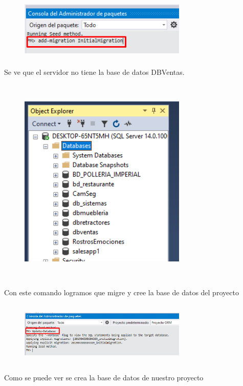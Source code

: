 \documentclass[12pt,a4paper,oneside]{book}
\begin{document}
\begin{enumerate}
\begin{enumerate}
\begin{enumerate}
								\begin{figure}[htb]
									\centering \includegraphics[width=8cm, height=3cm]{img/Migraciones/13comandos.png}
								\end{figure}
							Se ve que el servidor no tiene la base de datos DBVentas.  \\
								\begin{figure}[htb]
									\centering \includegraphics[width=8cm, height=10cm]{img/Migraciones/14datos.png}
								\end{figure}
					\newpage			
							Con este comando logramos que migre y cree la base de datos del proyecto  \\
								\begin{figure}[htb]
									\centering \includegraphics[width=8cm, height=3cm]{img/Migraciones/15consola.png}
								\end{figure}
							Como se puede ver se crea la base de datos de nuestro proyecto  \\

\end{enumerate}
\end{enumerate}
\end{enumerate}
\end{document}
